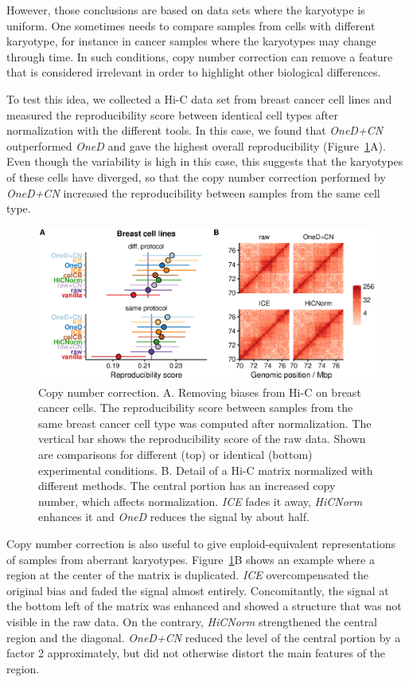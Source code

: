 \documentclass[a4,center,fleqn]{NAR}
\providecommand{\DIFadd}[1]{{\protect\color{red}#1}} %
\providecommand{\DIFdel}[1]{{\protect}}                      %
\providecommand{\DIFaddbegin}{} %
\providecommand{\DIFaddend}{} %
\providecommand{\DIFdelbegin}{} %
\providecommand{\DIFdelend}{} %
\providecommand{\DIFaddFL}[1]{\DIFadd{#1}} %
\providecommand{\DIFdelFL}[1]{\DIFdel{#1}} %
\providecommand{\DIFaddbeginFL}{} %
\providecommand{\DIFaddendFL}{} %
\providecommand{\DIFdelbeginFL}{} %
\providecommand{\DIFdelendFL}{} %
\begin{document}
However, those conclusions are based on data sets where the karyotype is
uniform. One sometimes needs to compare samples from cells with different
karyotype, for instance in cancer samples where the karyotypes may change
through time. In such conditions, copy number correction can remove a
feature that is considered irrelevant in order to highlight other
biological differences.

To test this idea, we collected a Hi-C data set from breast cancer cell
lines and measured the reproducibility score between identical cell types
after normalization with the different tools. In this case, we found that
\textit{OneD+CN} outperformed \textit{OneD} and gave the highest overall
reproducibility (Figure~\ref{fig:cnv_correction}A). Even though the
variability is high in this case, this suggests that the karyotypes of
these cells have diverged, so that the copy number correction performed by
\textit{OneD\DIFaddbegin \DIFadd{+CN}\DIFaddend } increased the reproducibility between samples from the same
cell type.

\begin{figure}
\centerline{\includegraphics[width=.49\textwidth]
  {figure_4.eps}}
\caption{Copy number correction. A. Removing biases from Hi-C on breast
cancer cells. The reproducibility score between samples from the same
breast cancer cell type was computed after normalization. The vertical bar
shows the reproducibility score of the raw data. Shown are comparisons for
different (top) or identical (bottom) experimental conditions. B. Detail
of a Hi-C matrix normalized with different methods. The central portion
has an increased copy number, which affects normalization. \textit{ICE}
fades it away, \DIFdelbeginFL \textit{\DIFdelFL{LGF}} %
\DIFdelendFL \DIFaddbeginFL \textit{\DIFaddFL{HiCNorm}} \DIFaddendFL enhances it and \textit{OneD} reduces the
signal by about half.}
\label{fig:cnv_correction}
\end{figure}

Copy number correction is also useful to give euploid-equivalent
representations of samples from aberrant karyotypes.
Figure~\ref{fig:cnv_correction}B shows an example where a region at the
center of the matrix is duplicated. \textit{ICE} overcompensated the
original bias and faded the signal almost entirely. Concomitantly, the
signal at the bottom left of the matrix was enhanced and showed a
structure that was not visible in the raw data. On the contrary,
\textit{\DIFdelbegin \DIFdel{LGF}\DIFdelend \DIFaddbegin \DIFadd{HiCNorm}\DIFaddend } strengthened the central region and the diagonal.
\textit{OneD\DIFaddbegin \DIFadd{+CN}\DIFaddend } reduced the level of the central portion by a factor 2
approximately, but did not otherwise distort the main features of the
region.
\end{document}
